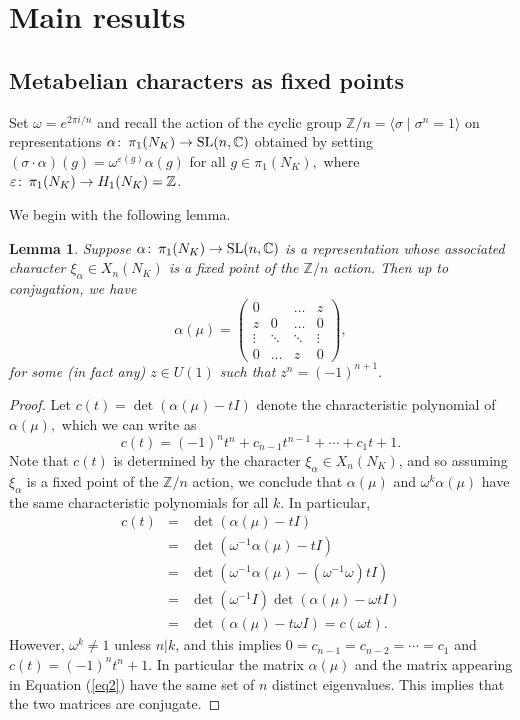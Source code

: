 \documentclass[12pt]{amsart}
\theoremstyle{plain}
\newtheorem{lemma}[thm]{Lemma}
\theoremstyle{remark}
\begin{document}
\section{Main results}
\subsection{Metabelian characters as fixed points}

Set ${\omega} = e^{2 \pi i/n}$ and recall the action
of the cyclic group ${{\mathbb Z}}/n =\langle {\sigma} \mid {\sigma}^n=1\rangle$ on
 representations ${\alpha} {\colon\thinspace} \pi_1(N_K) \to {{\rm SL}}(n,{{\mathbb C}})$ obtained by
  setting $({\sigma} \cdot {\alpha})(g)= {\omega}^{{\varepsilon}(g)} {\alpha}(g)$ for all $g \in \pi_1(N_K),$
where ${\varepsilon} {\colon\thinspace} \pi_1(N_K) \to H_1(N_K)={{\mathbb Z}}$.

We begin with the following  lemma.

\begin{lemma}\label{lem3}
Suppose ${\alpha} {\colon\thinspace} \pi_1(N_K) \to {{\rm SL}}(n,{{\mathbb C}})$ is a representation
whose associated character $\xi_{\alpha} \in X_n(N_K)$ is a fixed point
of the ${{\mathbb Z}}/n$ action. Then up to conjugation,
we have
\begin{equation} \label{eq2}
{\alpha}(\mu) =
\begin{pmatrix} 0& &\dots &z \\
z&0&\dots &0 \\
\vdots &\ddots &\ddots&\vdots \\
     0&\dots &z &0 \end{pmatrix},
     \end{equation}
for some (in fact any) $z \in U(1)$ such that $z^{n}=(-1)^{n+1}.$\end{lemma}

\begin{proof}
Let $c(t) = \det ({\alpha}(\mu)-tI)$ denote the characteristic polynomial
of ${\alpha}(\mu),$ which we can write as
$$c(t) = (-1)^n t^n + c_{n-1} t^{n-1} + \cdots + c_1 t +1.$$
Note that $c(t)$ is determined by the character $\xi_{\alpha} \in X_n(N_K)$,
and so assuming $\xi_{\alpha}$ is a fixed point of the ${{\mathbb Z}}/n$ action, we conclude that
${\alpha}(\mu)$ and ${\omega}^k {\alpha}(\mu)$ have the same characteristic polynomials for all $k$.
In particular,
\begin{eqnarray*}
c(t)&=&\det({\alpha}(\mu)-tI)\\
&=&\det ({\omega}^{-1} {\alpha}(\mu)-tI) \\
&=& \det ({\omega}^{-1} {\alpha}(\mu)-({\omega}^{-1} {\omega})tI)\\
&=&\det ({\omega}^{-1} I) \det ({\alpha}(\mu)- {\omega} tI) \\
&=&  \det ({\alpha}(\mu)-t {\omega} I) = c({\omega} t).
\end{eqnarray*}
However, ${\omega}^k \neq 1$ unless $n | k$, and this implies
$0=c_{n-1}=c_{n-2} = \cdots = c_1$ and $c(t) = (-1)^n t^n +1.$
In particular the matrix ${\alpha}(\mu)$ and the matrix appearing in
Equation (\ref{eq2}) have the same set of $n$ distinct eigenvalues. This implies that the two matrices are conjugate.
\end{proof}
\end{document}
